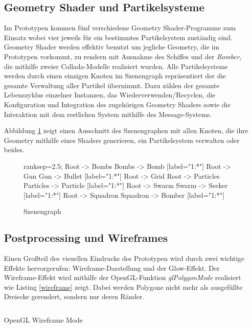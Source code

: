 \documentclass[a4paper]{article}
\begin{document}
\subsection{Geometry Shader und Partikelsysteme}
Im Prototypen kommen fünf verschiedene Geometry Shader-Programme zum Einsatz wobei vier jeweils für ein bestimmtes Partikelsystem zuständig sind. Geometry Shader werden effektiv benutzt um jegliche Geometry, die im Prototypen vorkommt, zu rendern mit Ausnahme des Schiffes und der \textit{Bomber}, die mithilfe zweier Collada-Modelle realisiert wurden. Alle Partikelsysteme werden durch einen einzigen Knoten im Szenengraph repräsentiert der die gesamte Verwaltung aller Partikel übernimmt. Dazu zählen der gesamte Lebenszyklus einzelner Instanzen, das Wiederverwenden/Recyclen, die Konfiguration und Integration des zugehörigen Geometry Shaders sowie die Interaktion mit dem restlichen System mithilfe des Message-Systems.

Abbildung \ref{scenegraph} zeigt einen Ausschnitt des Szenengraphen mit allen Knoten, die ihre Geometry mithilfe eines Shaders generieren, ein Partikelsystem verwalten oder beides.

\begin{figure}[H]
\centering
{} {
    ranksep=2.5;
    Root -> Bombs
    Bombs -> Bomb [label="1:*"]
    Root -> Gun
    Gun -> Bullet [label="1:*"]
    Root -> Grid
    Root -> Particles
    Particles -> Particle [label="1:*"]
    Root -> Swarm
    Swarm -> Seeker [label="1:*"]
    Root -> Squadron
    Squadron -> Bomber [label="1:*"]
}
\caption{Szenengraph}
\label{scenegraph}
\end{figure}

\subsection{Postprocessing und Wireframes}
Einen Großteil des visuellen Eindrucks des Prototypen wird durch zwei wichtige Effekte hervorgerufen: Wireframe-Darstellung und der Glow-Effekt. Der Wireframe-Effekt wird mithilfe der OpenGL-Funktion \textit{glPolygonMode} realisiert wie Listing \ref{wireframe} zeigt. Dabei werden Polygone nicht mehr als ausgefüllte Dreiecke gerendert, sondern nur deren Ränder.

\begin{listing}[H]
\inputminted[firstline=10, lastline=10]{scala}{../scala/org/whiskeysierra/powpow/EnableWireframe.scala}
\caption{OpenGL Wireframe Mode}
\label{wireframe}
\end{listing}
\end{document}
